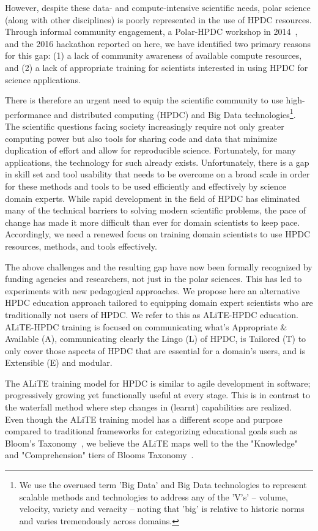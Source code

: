\documentclass[conference]{IEEEtran}
\begin{document}
However, despite these data- and compute-intensive scientific needs, polar science (along with other disciplines) is poorly represented in the use of HPDC resources. Through informal community engagement, a Polar-HPDC workshop in 2014~\cite{Workshop2014}, and the 2016 hackathon reported on here, we have identified two primary reasons for this gap: (1) a lack of community awareness of available compute resources, and (2) a lack of appropriate training for scientists interested in using HPDC for science applications. 

There is therefore an urgent need to equip the scientific community to use high-performance and distributed computing (HPDC) and Big Data technologies\footnote{ We use the overused term 'Big Data' and Big Data technologies to represent scalable methods and technologies to address any of the 'V's'  -- volume, velocity, variety and veracity -- noting that 'big' is relative to historic norms and varies tremendously across domains.}. The scientific questions facing society increasingly require not only greater computing power but also tools for sharing code and data that minimize duplication of effort and allow for reproducible science. Fortunately, for many applications, the technology for such already exists. Unfortunately, there is a gap in skill set and tool usability that needs to be overcome on a broad scale in order for these methods and tools to be used efficiently and effectively by science domain experts. While rapid development in the field of HPDC has eliminated many of the technical barriers to solving modern scientific problems, the pace of change has made it more difficult than ever for domain scientists to keep pace. Accordingly, we need a renewed focus on training domain scientists to use HPDC resources, methods, and tools effectively. 

The above challenges and the resulting gap have now been formally recognized
by funding agencies and researchers, not just in the polar sciences. This has
led to experiments with new pedagogical approaches. We propose here an
alternative HPDC education approach tailored to equipping domain expert
scientists who are traditionally not users of HPDC.  We refer to this as
ALiTE-HPDC education. ALiTE-HPDC training is focused on communicating what's
Appropriate \& Available (A), communicating clearly the Lingo (L) of HPDC, is
Tailored (T) to only cover those aspects of HPDC that are essential for a
domain's users, and is Extensible (E) and modular.  

The ALiTE training model for HPDC is similar to agile development in software;
progressively growing yet functionally useful at every stage. This is in
contrast to the waterfall method where step changes in (learnt) capabilities
are realized. Even though the ALiTE training model has a different scope and
purpose  compared to traditional frameworks for categorizing educational goals
such as Bloom's Taxonomy~\cite{bloom}, we believe the ALiTE maps well to the
the "Knowledge" and "Comprehension" tiers of 
Blooms Taxonomy~\cite{bloom-vanderbilt}.
\end{document}
